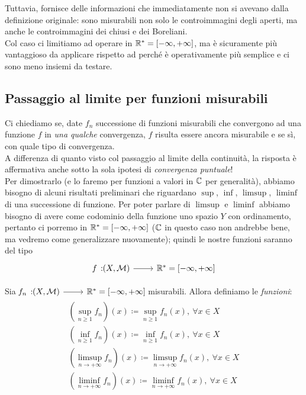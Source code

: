 Tuttavia,  fornisce delle informazioni che immediatamente non si avevano dalla definizione originale: sono misurabili non solo le controimmagini degli aperti, ma anche le controimmagini dei chiusi e dei Boreliani.\\
Col caso  ci limitiamo ad operare in $\mathbb{R}^{\ast}=\left[-\infty,+\infty\right]$, ma è sicuramente più vantaggioso da applicare rispetto ad  perché è operativamente più semplice e ci sono meno insiemi da testare.
\subsection{Passaggio al limite per funzioni misurabili}
Ci chiediamo se, date $f_n$ successione di funzioni misurabili che convergono ad una funzione $f$ in \textit{una qualche} convergenza, $f$ risulta essere ancora misurabile e se sì, con quale tipo di convergenza.\\
A differenza di quanto visto col passaggio al limite della continuità, la risposta è affermativa anche sotto la sola ipotesi di \textit{convergenza puntuale}!\\
Per dimostrarlo (e lo faremo per funzioni a valori in $\mathbb{C}$ per generalità), abbiamo bisogno di alcuni risultati preliminari che riguardano $\sup$, $\inf$, $\limsup$, $\liminf$ di una successione di funzione. Per poter parlare di $\limsup$ e $\liminf$ abbiamo bisogno di avere come codominio della funzione uno spazio $Y$ con ordinamento, pertanto ci porremo in  $\mathbb{R}^{\ast}=\left[-\infty,+\infty\right]$ ($\mathbb{C}$ in questo caso non andrebbe bene, ma vedremo come generalizzare nuovamente); quindi le nostre funzioni saranno del tipo
\begin{equation*}
\funz{f}{\left(X,\mathcal{M}\right)}{\realset^{\ast}=\left[-\infty,+\infty\right]}
\end{equation*}
\begin{define}	
Sia $\funz{f_n}{\left(X,\mathcal{M}\right)}{\realset^{\ast}=\left[-\infty,+\infty\right]}$ misurabili.
Allora definiamo le \textit{funzioni}:
\begin{gather*}
	\left(\sup_{n\geq 1} f_n\right)(x)\coloneqq \sup_{n\geq 1}f_n(x),\ \forall x\in X\\
	\left(\inf_{n\geq 1} f_n\right)(x)\coloneqq \inf_{n\geq 1}f_n(x),\ \forall x\in X\\
	\left(\limsup_{n\to+\infty} f_n\right)(x)\coloneqq \limsup_{n\to+\infty}f_n(x),\ \forall x\in X\\
	\left(\liminf_{n\to+\infty} f_n\right)(x)\coloneqq \liminf_{n\to+\infty}f_n(x),\ \forall x\in X
\end{gather*}
\end{define}
